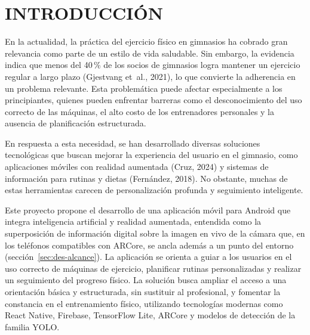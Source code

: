 \chapter{INTRODUCCIÓN}
\label{cap:introduccion}

En la actualidad, la práctica del ejercicio físico en gimnasios ha cobrado gran
relevancia como parte de un estilo de vida saludable. Sin embargo, la evidencia
indica que menos del 40\,\% de los socios de gimnasios logra mantener un
ejercicio regular a largo plazo (Gjestvang et~al., 2021), lo que convierte la
adherencia en un problema relevante. Esta problemática puede afectar
especialmente a los principiantes, quienes pueden enfrentar barreras como el
desconocimiento del uso correcto de las máquinas, el alto costo de los
entrenadores personales y la ausencia de planificación estructurada.

En respuesta a esta necesidad, se han desarrollado diversas soluciones
tecnológicas que buscan mejorar la experiencia del usuario en el gimnasio, como
aplicaciones móviles con realidad aumentada (Cruz, 2024) y sistemas de
información para rutinas y dietas (Fernández, 2018). No obstante, muchas de
estas herramientas carecen de personalización profunda y seguimiento
inteligente.

Este proyecto propone el desarrollo de una aplicación móvil para Android que
integra inteligencia artificial y realidad aumentada, entendida como la
superposición de información digital sobre la imagen en vivo de la cámara que,
en los teléfonos compatibles con ARCore, se ancla además a un punto del entorno
(sección~\ref{sec:des-alcance}). La aplicación se orienta a guiar a
los usuarios en el uso correcto de máquinas de ejercicio, planificar rutinas
personalizadas y realizar un seguimiento del progreso físico. La solución busca
ampliar el acceso a una orientación básica y estructurada, sin sustituir al
profesional, y fomentar la constancia en el entrenamiento físico, utilizando
tecnologías modernas como React Native, Firebase, TensorFlow Lite, ARCore y
modelos de detección de la familia YOLO.


